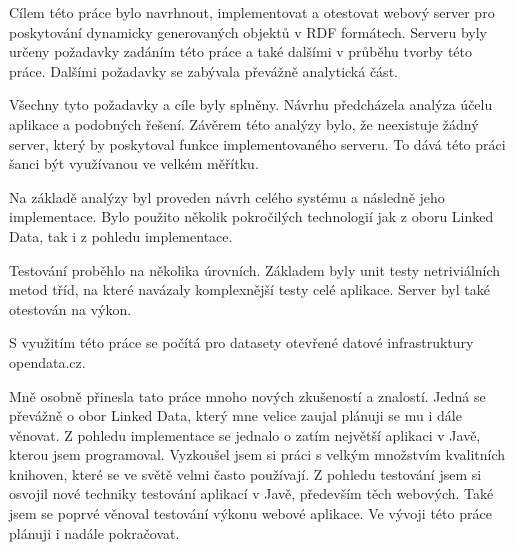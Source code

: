 \documentclass[thesis=B,czech]{FITthesis}[2012/06/26]
\begin{document}
\begin{conclusion}
Cílem této práce bylo navrhnout, implementovat a otestovat webový server pro poskytování dynamicky generovaných objektů v RDF formátech.
Serveru byly určeny požadavky zadáním této práce a také dalšími v průběhu tvorby této práce. Dalšími požadavky se zabývala převážně analytická část.

Všechny tyto požadavky a cíle byly splněny.
Návrhu předcházela analýza účelu aplikace a podobných řešení. Závěrem této analýzy bylo, že neexistuje žádný server, který by poskytoval funkce
implementovaného serveru. To dává této práci šanci být využívanou ve velkém měřítku.

Na základě analýzy byl proveden návrh celého systému a následně jeho implementace. Bylo použito několik pokročilých technologií jak z oboru Linked Data,
tak i z pohledu implementace.

Testování proběhlo na několika úrovních. Základem byly unit testy netriviálních metod tříd, na které navázaly komplexnější testy celé aplikace.
Server byl také otestován na výkon.

S využitím této práce se počítá pro datasety otevřené datové infrastruktury opendata.cz.

Mně osobně přinesla tato práce mnoho nových zkušeností a znalostí. Jedná se převážně o obor Linked Data, který mne velice zaujal plánuji se mu i dále věnovat.
Z pohledu implementace se jednalo o zatím největší aplikaci v Javě, kterou jsem programoval. Vyzkoušel jsem si práci s velkým množstvím kvalitních knihoven,
které se ve světě velmi často používají. Z pohledu testování jsem si osvojil nové techniky testování aplikací v Javě, především těch webových. Také jsem se poprvé
věnoval testování výkonu webové aplikace.
Ve vývoji této práce plánuji i nadále pokračovat.


\end{conclusion}




\appendix
\end{document}
